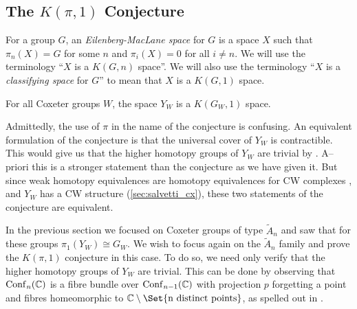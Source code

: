 \documentclass[class=article, crop=false]{standalone}
\begin{document}
	
\subsection{The $K(\pi,1)$ Conjecture}
For a group $G$, an \emph{Eilenberg-MacLane space} \cite{eilenberg_relations_1945} for $G$ is a space $X$ such that $\pi_n(X)=G$ for some $n$ and $\pi_i(X) = 0$ for all $i\neq n$. We will use the terminology ``$X$ is a $K(G,n)$ space''. We will also use the terminology ``$X$ is a \emph{classifying space} for $G$'' to mean that $X$ is a $K(G,1)$ space.
\begin{conjecture}[$K(\pi,1)$ Conjecture]
	For all Coxeter groups $W$, the space $Y_W$ is a $K(G_W,1)$ space.
\end{conjecture}

Admittedly, the use of $\pi$ in the name of the conjecture is confusing. An equivalent formulation of the conjecture is that the universal cover of $Y_W$ is contractible. This would give us that the higher homotopy groups of $Y_W$ are trivial by \cite[Porposition 4.1]{hatcher_algebraic_2001}. A--priori this is a stronger statement than the conjecture as we have given it. But since weak homotopy equivalences are homotopy equivalences for CW complexes \cite[Theorem 4.5]{hatcher_algebraic_2001}, and $Y_W$ has a CW structure (\cref{sec:salvetti_cx}), these two statements of the conjecture are equivalent.

In the previous section we focused on Coxeter groups of type $\tilde{A}_n$ and saw that for these groups $\pi_1(Y_W) \cong G_W$. We wish to focus again on the $\tilde{A}_n$ family and prove the $K(\pi, 1)$ conjecture in this case. To do so, we need only verify that the higher homotopy groups of $Y_W$ are trivial. This can be done by observing that $\operatorname{Conf}_n(\mathbb{C})$ is a fibre bundle over $\operatorname{Conf}_{n-1}(\mathbb{C})$ with projection $p$ forgetting a point and fibres homeomorphic to $\C \setminus \Set{\text{n distinct points}}$, as spelled out in \cite{sinha_homology_2010}.
\end{document}
